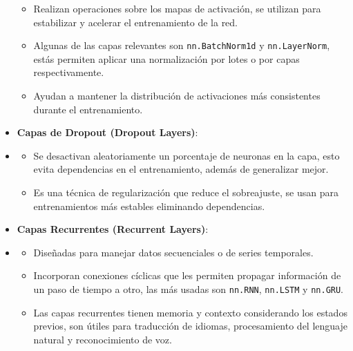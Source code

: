 \begin{itemize}
        \begin{itemize}
            \item Realizan operaciones sobre los mapas de activación, se utilizan para estabilizar y acelerar el entrenamiento de la red.
            \item Algunas de las capas relevantes son \texttt{nn.BatchNorm1d} y \texttt{nn.LayerNorm}, estás permiten aplicar una normalización por lotes o por capas respectivamente.
            \item Ayudan a mantener la distribución de activaciones más consistentes durante el entrenamiento.
        \end{itemize}
    \item \textbf{Capas de Dropout (Dropout Layers)}:
    \item[]
        \begin{itemize}
            \item Se desactivan aleatoriamente un porcentaje de neuronas en la capa, esto evita dependencias en el entrenamiento, además de generalizar mejor.
            \item Es una técnica de regularización que reduce el sobreajuste, se usan para entrenamientos más estables eliminando dependencias.
        \end{itemize}
    \item \textbf{Capas Recurrentes (Recurrent Layers)}:
    \item[]
        \begin{itemize}
            \item Diseñadas para manejar datos secuenciales o de series temporales.
            \item Incorporan conexiones cíclicas que les permiten propagar información de un paso de tiempo a otro, las más usadas son \texttt{nn.RNN}, \texttt{nn.LSTM} y \texttt{nn.GRU}.
            \item Las capas recurrentes tienen memoria y contexto considerando los estados previos, son útiles para traducción de idiomas, procesamiento del lenguaje natural y reconocimiento de voz.
        \end{itemize}
\end{itemize}


